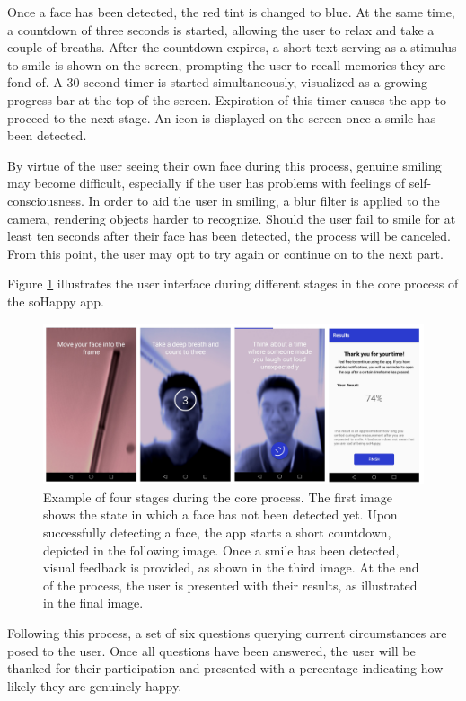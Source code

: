 Once a face has been detected, the red tint is changed to blue. At the same time, a countdown of three seconds is started, allowing the user to relax and take a couple of breaths.
After the countdown expires, a short text serving as a stimulus to smile is shown on the screen, prompting the user to recall memories they are fond of.
A 30 second timer is started simultaneously, visualized as a growing progress bar at the top of the screen. Expiration of this timer causes the app to proceed to the next stage.
An icon is displayed on the screen once a smile has been detected.

By virtue of the user seeing their own face during this process, genuine smiling may become difficult, especially if the user has problems with feelings of self-consciousness. In order to aid the user in smiling, a blur filter is applied to the camera, rendering objects harder to recognize.
Should the user fail to smile for at least ten seconds after their face has been detected, the process will be canceled. From this point, the user may opt to try again or continue on to the next part.

Figure \ref{fig:user_journey} illustrates the user interface during different stages in the core process of the soHappy app.

\begin{figure}
  \includegraphics[width=\linewidth]{figures/user_journey.jpg}
  \caption{Example of four stages during the core process. The first image shows the state in which a face has not been detected yet. Upon successfully detecting a face, the app starts a short countdown, depicted in the following image. Once a smile has been detected, visual feedback is provided, as shown in the third image. At the end of the process, the user is presented with their results, as illustrated in the final image.}
  \label{fig:user_journey}
\end{figure}

Following this process, a set of six questions querying current circumstances are posed to the user. Once all questions have been answered, the user will be thanked for their participation and presented with a percentage indicating how likely they are genuinely happy.

